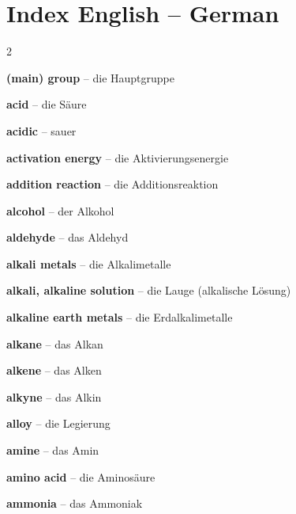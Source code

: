 \newpage
\section{Index English -- German}
\begin{multicols}{2}\small\raggedright

\medskip{\large\textbf{\color{cornflower}(}}\par\nopagebreak
\textbf{(main) group} -- die Hauptgruppe\dotfill\hyperref[e:87]{\pageref*{e:87}}\par

\par\nopagebreak
\textbf{acid} -- die Säure\dotfill\hyperref[e:152]{\pageref*{e:152}}\par
\textbf{acidic} -- sauer\dotfill\hyperref[e:155]{\pageref*{e:155}}\par
\textbf{activation energy} -- die Aktivierungsenergie\dotfill\hyperref[e:141]{\pageref*{e:141}}\par
\textbf{addition reaction} -- die Additionsreaktion\dotfill\hyperref[e:228]{\pageref*{e:228}}\par
\textbf{alcohol} -- der Alkohol\dotfill\hyperref[e:219]{\pageref*{e:219}}\par
\textbf{aldehyde} -- das Aldehyd\dotfill\hyperref[e:221]{\pageref*{e:221}}\par
\textbf{alkali metals} -- die Alkalimetalle\dotfill\hyperref[e:88]{\pageref*{e:88}}\par
\textbf{alkali, alkaline solution} -- die Lauge (alkalische Lösung)\dotfill\hyperref[e:154]{\pageref*{e:154}}\par
\textbf{alkaline earth metals} -- die Erdalkalimetalle\dotfill\hyperref[e:89]{\pageref*{e:89}}\par
\textbf{alkane} -- das Alkan\dotfill\hyperref[e:210]{\pageref*{e:210}}\par
\textbf{alkene} -- das Alken\dotfill\hyperref[e:211]{\pageref*{e:211}}\par
\textbf{alkyne} -- das Alkin\dotfill\hyperref[e:212]{\pageref*{e:212}}\par
\textbf{alloy} -- die Legierung\dotfill\hyperref[e:17]{\pageref*{e:17}}\par
\textbf{amine} -- das Amin\dotfill\hyperref[e:226]{\pageref*{e:226}}\par
\textbf{amino acid} -- die Aminosäure\dotfill\hyperref[e:227]{\pageref*{e:227}}\par
\textbf{ammonia} -- das Ammoniak\dotfill\hyperref[e:182]{\pageref*{e:182}}\par

\end{multicols}
